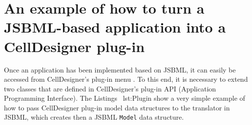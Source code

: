 \documentclass[
  BCOR12mm,
  letterpaper,
  11pt,
  headsepline,
  pointlessnumbers,
  tablecaptionabove,
  onelinecaption,
  headinclude,
  appendixprefix,
  idxtotoc,
  bibtotoc,
  twoside,
  titlepage
]{scrartcl}
\begin{document}
\section{An example of how to turn a JSBML-based application into a CellDesigner
plug-in}

Once an application has been implemented based on JSBML, it can easily be
accessed from CellDesigner's plug-in menu \citep{Funahashi2003}. To this end,
it is necessary to extend two classes that are defined in CellDesigner's plug-in
API (Application Programming Interface). The Listings~
{lst:Plugin} show a very simple example of how to pass CellDesigner plug-in
model data structures to the translator in JSBML,
which creates then a JSBML \texttt{Model} data structure.

% 
\end{document}
